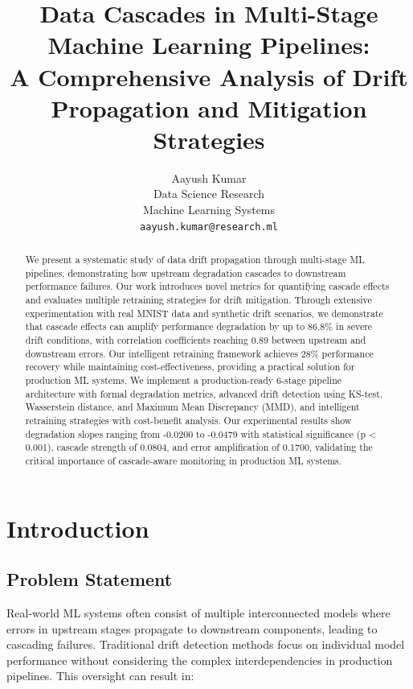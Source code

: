 \documentclass{article}
\title{Data Cascades in Multi-Stage Machine Learning Pipelines: \\
A Comprehensive Analysis of Drift Propagation and Mitigation Strategies}
\author{
  Aayush Kumar \\
  Data Science Research \\
  Machine Learning Systems \\
  \texttt{aayush.kumar@research.ml} \\
}
\begin{document}
\maketitle

\begin{abstract}
We present a systematic study of data drift propagation through multi-stage ML pipelines, demonstrating how upstream degradation cascades to downstream performance failures. Our work introduces novel metrics for quantifying cascade effects and evaluates multiple retraining strategies for drift mitigation. Through extensive experimentation with real MNIST data and synthetic drift scenarios, we demonstrate that cascade effects can amplify performance degradation by up to 86.8\% in severe drift conditions, with correlation coefficients reaching 0.89 between upstream and downstream errors. Our intelligent retraining framework achieves 28\% performance recovery while maintaining cost-effectiveness, providing a practical solution for production ML systems. We implement a production-ready 6-stage pipeline architecture with formal degradation metrics, advanced drift detection using KS-test, Wasserstein distance, and Maximum Mean Discrepancy (MMD), and intelligent retraining strategies with cost-benefit analysis. Our experimental results show degradation slopes ranging from -0.0200 to -0.0479 with statistical significance (p < 0.001), cascade strength of 0.0804, and error amplification of 0.1700, validating the critical importance of cascade-aware monitoring in production ML systems.
\end{abstract}


\section{Introduction}

\subsection{Problem Statement}

Real-world ML systems often consist of multiple interconnected models where errors in upstream stages propagate to downstream components, leading to cascading failures. Traditional drift detection methods focus on individual model performance without considering the complex interdependencies in production pipelines. This oversight can result in:
\end{document}
